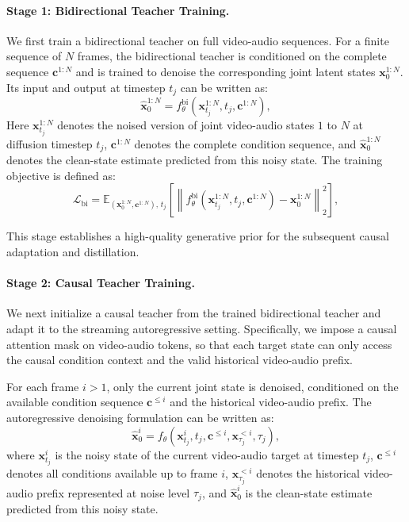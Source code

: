 \paragraph{Stage 1: Bidirectional Teacher Training.} 
We first train a bidirectional teacher on full video-audio sequences. 
For a finite sequence of $N$ frames, the bidirectional teacher is conditioned on the complete sequence ${\bm{c}}^{1:N}$ and is trained to denoise the corresponding joint latent states ${\bm{x}}_{0}^{1:N}$.
Its input and output at timestep $t_j$ can be written as:
\begin{equation}
\hat{{\bm{x}}}_{0}^{1:N}
=
f_\theta^{\mathrm{bi}}({\bm{x}}_{t_j}^{1:N},t_j,{\bm{c}}^{1:N}),
\label{eq:bidirectional_teacher}
\end{equation}
Here ${\bm{x}}_{t_j}^{1:N}$ denotes the noised version of joint video-audio states $1$ to $N$ at diffusion timestep $t_j$, ${\bm{c}}^{1:N}$ denotes the complete condition sequence, and $\hat{{\bm{x}}}_{0}^{1:N}$ denotes the clean-state estimate predicted from this noisy state. The training objective is defined as:
\begin{equation}
\mathcal{L}_{\mathrm{bi}}
=
\mathbb{E}_{({\bm{x}}_0^{1:N},{\bm{c}}^{1:N}),\,t_j}
\left[
\left\|
f_\theta^{\mathrm{bi}}({\bm{x}}_{t_j}^{1:N},t_j,{\bm{c}}^{1:N})
-
{\bm{x}}_{0}^{1:N}
\right\|_2^2
\right],
\label{eq:bi_loss}
\end{equation}

This stage establishes a high-quality generative prior for the subsequent causal adaptation and distillation.

\paragraph{Stage 2: Causal Teacher Training.}
We next initialize a causal teacher from the trained bidirectional teacher and adapt it to the streaming autoregressive setting. 
Specifically, we impose a causal attention mask on video-audio tokens, so that each target state can only access the causal condition context and the valid historical video-audio prefix. 

For each frame $i>1$, only the current joint state is denoised, conditioned on the available condition sequence ${\bm{c}}^{\leq i}$ and the historical video-audio prefix. 
The autoregressive denoising formulation can be written as:
\begin{equation}
\hat{{\bm{x}}}_{0}^{i}
=
f_\theta({\bm{x}}_{t_j}^{i},t_j,{\bm{c}}^{\leq i},{\bm{x}}_{\tau_j}^{<i},\tau_j),
\label{eq:ar_generation}
\end{equation}
where ${\bm{x}}_{t_j}^{i}$ is the noisy state of the current video-audio target at timestep $t_j$, ${\bm{c}}^{\leq i}$ denotes all conditions available up to frame $i$, ${\bm{x}}_{\tau_j}^{<i}$ denotes the historical video-audio prefix represented at noise level $\tau_j$, and $\hat{{\bm{x}}}_{0}^{i}$ is the clean-state estimate predicted from this noisy state.

